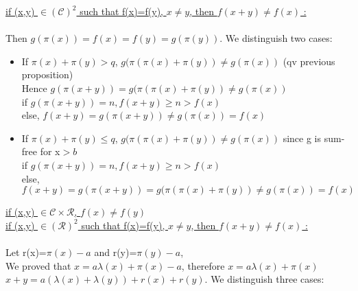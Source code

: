 \underline{if (x,y) \(\in (\mathcal{C})^2\) such that f(x)=f(y), \(x \neq y\), then \(f(x+y)\neq f(x)\)  :}\\
\\Then  \(g(\pi(x))=f(x)=f(y)=g(\pi(y))\). We distinguish two cases:

\begin{itemize}
\item If \(\pi(x)+\pi(y)>q\), \(g(\pi(\pi(x)+\pi(y)) \neq g(\pi(x))\) (qv previous proposition)
\\Hence \(g(\pi(x+y))= g(\pi(\pi(x)+\pi(y))\neq g(\pi(x))\)
\\if \(g(\pi(x+y))=n, f(x+y)\geqslant n > f(x)\)
\\else, \(f(x+y)=g(\pi(x+y))\neq g(\pi(x))=f(x)\)
\item If  \(\pi(x)+\pi(y)\leqslant q\), \(g(\pi(\pi(x)+\pi(y)) \neq g(\pi(x))\) since g is sum-free for x\(>b\)
\\if \(g(\pi(x+y))=n, f(x+y)\geqslant n > f(x)\)
\\else, \(f(x+y)=g(\pi(x+y))=g(\pi(\pi(x)+\pi(y))\neq g(\pi(x))=f(x)\)


\end{itemize}



\underline{if (x,y) \(\in \mathcal{C} \times \mathcal{R} \), \(f(x)\neq f(y)\)}\\

\underline{if (x,y) \(\in (\mathcal{R})^2\) such that f(x)=f(y), \(x \neq y\), then \(f(x+y)\neq f(x)\)  :}\\
\\Let r(x)=\(\pi(x)-a\) and r(y)=\(\pi(y)-a\),
\\We proved that \(x=a\lambda(x)+\pi(x)-a\), therefore \(x=a\lambda(x)+\pi(x)\)
\\\(x+y=a(\lambda(x)+\lambda(y))+r(x)+r(y)\). We distinguish three cases:

